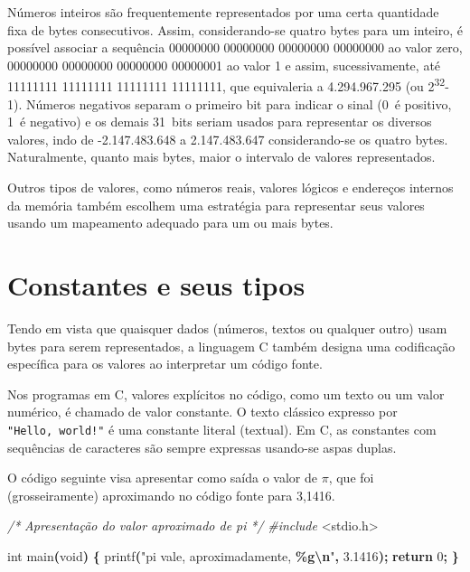 \documentclass[
  11pt,
  a4paper,
]{scrbook}
\newenvironment{Shaded}{\begin{snugshade}}{\end{snugshade}}
\newcommand{\CommentTok}[1]{\textcolor[rgb]{0.56,0.35,0.01}{\textit{#1}}}
\newcommand{\ControlFlowTok}[1]{\textcolor[rgb]{0.13,0.29,0.53}{\textbf{#1}}}
\newcommand{\DataTypeTok}[1]{\textcolor[rgb]{0.13,0.29,0.53}{#1}}
\newcommand{\DecValTok}[1]{\textcolor[rgb]{0.00,0.00,0.81}{#1}}
\newcommand{\FloatTok}[1]{\textcolor[rgb]{0.00,0.00,0.81}{#1}}
\newcommand{\ImportTok}[1]{#1}
\newcommand{\NormalTok}[1]{#1}
\newcommand{\OperatorTok}[1]{\textcolor[rgb]{0.81,0.36,0.00}{\textbf{#1}}}
\newcommand{\PreprocessorTok}[1]{\textcolor[rgb]{0.56,0.35,0.01}{\textit{#1}}}
\newcommand{\SpecialCharTok}[1]{\textcolor[rgb]{0.81,0.36,0.00}{\textbf{#1}}}
\newcommand{\StringTok}[1]{\textcolor[rgb]{0.31,0.60,0.02}{#1}}
\begin{document}
Números inteiros são frequentemente representados por uma certa
quantidade fixa de bytes consecutivos. Assim, considerando-se quatro
bytes para um inteiro, é possível associar a sequência 00000000 00000000
00000000 00000000 ao valor zero, 00000000 00000000 00000000 00000001 ao
valor 1 e assim, sucessivamente, até 11111111 11111111 11111111
11111111, que equivaleria a 4.294.967.295 (ou 2\textsuperscript{32}-1).
Números negativos separam o primeiro bit para indicar o sinal (0~é
positivo, 1~é negativo) e os demais 31~bits seriam usados para
representar os diversos valores, indo de -2.147.483.648 a 2.147.483.647
considerando-se os quatro bytes. Naturalmente, quanto mais bytes, maior
o intervalo de valores representados.

Outros tipos de valores, como números reais, valores lógicos e endereços
internos da memória também escolhem uma estratégia para representar seus
valores usando um mapeamento adequado para um ou mais bytes.

\section{Constantes e seus tipos}\label{sec-constantes-e-seus-tipos}

Tendo em vista que quaisquer dados (números, textos ou qualquer outro)
usam bytes para serem representados, a linguagem C também designa uma
codificação específica para os valores ao interpretar um código fonte.

Nos programas em C, valores explícitos no código, como um texto ou um
valor numérico, é chamado de valor constante. O texto clássico expresso
por \texttt{"Hello,\ world!"} é uma constante literal (textual). Em C,
as constantes com sequências de caracteres são sempre expressas
usando-se aspas duplas.

O código seguinte visa apresentar como saída o valor de \(\pi\), que foi
(grosseiramente) aproximando no código fonte para 3,1416.

\begin{Shaded}
\begin{Highlighting}[]
\CommentTok{/*}
\CommentTok{Apresentação do valor aproximado de pi}
\CommentTok{*/}
\PreprocessorTok{\#include }\ImportTok{\textless{}stdio.h\textgreater{}}

\DataTypeTok{int}\NormalTok{ main}\OperatorTok{(}\DataTypeTok{void}\OperatorTok{)} \OperatorTok{\{}
\NormalTok{    printf}\OperatorTok{(}\StringTok{"pi vale, aproximadamente, }\SpecialCharTok{\%g\textbackslash{}n}\StringTok{"}\OperatorTok{,} \FloatTok{3.1416}\OperatorTok{);}
    \ControlFlowTok{return} \DecValTok{0}\OperatorTok{;}
\OperatorTok{\}}
\end{Highlighting}
\end{Shaded}
\end{document}
